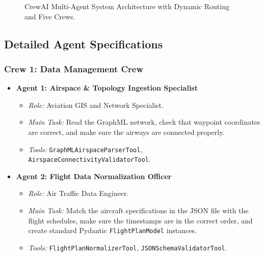 \documentclass[12pt,a4paper]{article}
\begin{document}
\begin{figure}[htbp]

\caption{CrewAI Multi-Agent System Architecture with Dynamic Routing and Five Crews.}
\end{figure}


\subsection{Detailed Agent Specifications}

\subsubsection{Crew 1: Data Management Crew}

\begin{itemize}[leftmargin=*]
    \item \textbf{Agent 1: Airspace \& Topology Ingestion Specialist}
\begin{itemize}
    \item \textit{Role:} Aviation GIS and Network Specialist.
    \item \textit{Main Task:} Read the GraphML network, check that waypoint coordinates are correct, and make sure the airways are connected properly.
    \item \textit{Tools:} \texttt{GraphMLAirspaceParserTool}, \texttt{AirspaceConnectivityValidatorTool}.
\end{itemize}

    \item \textbf{Agent 2: Flight Data Normalization Officer}
\begin{itemize}
    \item \textit{Role:} Air Traffic Data Engineer.
    \item \textit{Main Task:} Match the aircraft specifications in the JSON file with the flight schedules, make sure the timestamps are in the correct order, and create standard Pydantic \texttt{FlightPlanModel} instances.
    \item \textit{Tools:} \texttt{FlightPlanNormalizerTool}, \texttt{JSONSchemaValidatorTool}.
\end{itemize}
\end{itemize}
\end{document}
